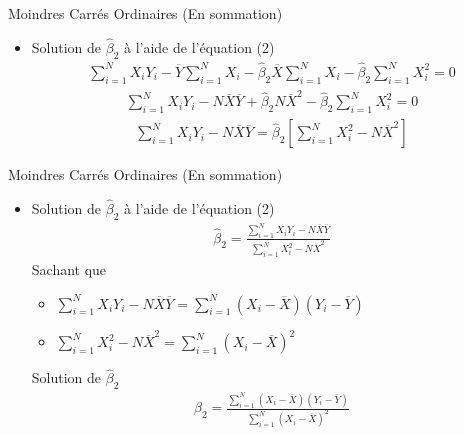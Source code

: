 \documentclass{beamer}
\begin{document}
\begin{frame}{Moindres Carrés Ordinaires (En sommation)}
\begin{itemize}
  \item Solution de \( \hat{\beta}_2 \) à l'aide de l'équation (2)
  \begin{align*}
    \sum_{i=1}^N X_i Y_i - \overline{Y} \sum_{i=1}^N X_i - \hat{\beta}_2 \overline{X} \sum_{i=1}^N X_i - \hat{\beta}_2 \sum_{i=1}^N X_i^2 = 0
  \end{align*}
  \begin{align*}
    \sum_{i=1}^N X_i Y_i - N \overline{X} \overline{Y} + \hat{\beta}_2 N \overline{X}^2 - \hat{\beta}_2 \sum_{i=1}^N X_i^2 = 0
  \end{align*}
  \begin{align*}
    \sum_{i=1}^N X_i Y_i - N \overline{X} \overline{Y} = \hat{\beta}_2 \left[ \sum_{i=1}^N X_i^2 - N \overline{X}^2 \right]
  \end{align*}
\end{itemize}
\end{frame}

\begin{frame}{Moindres Carrés Ordinaires (En sommation)}
\begin{itemize}
  \item Solution de \( \hat{\beta}_2 \) à l'aide de l'équation (2)
  \begin{align*}
    \hat{\beta}_2 = \frac{\sum_{i=1}^N X_i Y_i - N \overline{X} \overline{Y}}{\sum_{i=1}^N X_i^2 - N \overline{X}^2}
  \end{align*}
  Sachant que 
  \begin{itemize}
    \item \( \sum_{i=1}^N X_i Y_i - N \overline{X} \overline{Y} = \sum_{i=1}^N (X_i - \overline{X})(Y_i - \overline{Y}) \)
    \item \( \sum_{i=1}^N X_i^2 - N \overline{X}^2 = \sum_{i=1}^N (X_i - \overline{X})^2 \)
  \end{itemize}
  \begin{block}{Solution de \( \hat{\beta}_2 \)}
    \begin{align*}
      \hat{\beta}_2 = \frac{\sum_{i=1}^N (X_i - \overline{X})(Y_i - \overline{Y})}{\sum_{i=1}^N (X_i - \overline{X})^2}
    \end{align*}
  \end{block}
\end{itemize}
\end{frame}

\end{document}
